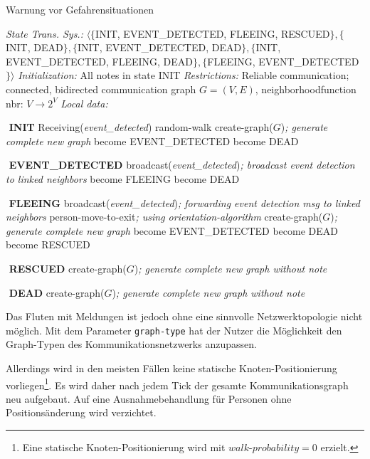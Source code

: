 \begin{algorithm}
\caption{Warnung vor Gefahrensituationen}
\label{alg:event_detected}
\begin{algorithmic} 
\STATE \textit{State Trans. Sys.:} $\langle\{$INIT, EVENT{\_}DETECTED, FLEEING, RESCUED$\}, \{$INIT, DEAD$\}, \{$INIT, EVENT{\_}DETECTED, DEAD$\}, \{$INIT, EVENT{\_}DETECTED, FLEEING, DEAD$\}, \{$FLEEING, EVENT{\_}DETECTED$\}\rangle$
\STATE \textit{Initialization:} All notes in state INIT
\STATE \textit{Restrictions:} Reliable communication; connected, bidirected communication graph $G = (V,E)$, neighborhoodfunction nbr: $V \rightarrow 2^{V}$
\STATE \textit{Local data:}

\STATE $ $
\STATE \textbf{INIT}
\STATE Receiving(\textit{event{\_}detected})
\STATE random-walk
\STATE create-graph($G$)\hfill\emph{; generate complete new graph}
\ENDWHILE
\STATE become EVENT{\_}DETECTED
\STATE become DEAD
\ENDIF

\STATE $ $
\STATE \textbf{EVENT{\_}DETECTED}
\STATE broadcast(\textit{event{\_}detected})\hfill\emph{; broadcast event detection to linked neighbors}
\STATE become FLEEING
\STATE become DEAD
\ENDIF

\STATE $ $
\STATE \textbf{FLEEING}
\STATE broadcast(\textit{event{\_}detected})\hfill\emph{; forwarding event detection msg to linked neighbors}
\ENDIF
{}
\STATE person-move-to-exit\hfill\emph{; using orientation-algorithm}
\STATE create-graph($G$)\hfill\emph{; generate complete new graph}
\STATE become EVENT{\_}DETECTED
\ENDIF
{}
\STATE become DEAD
\ENDIF
\ENDWHILE
\STATE become RESCUED

\STATE $ $
\STATE \textbf{RESCUED}
\STATE create-graph($G$)\hfill\emph{; generate complete new graph without note}

\STATE $ $
\STATE \textbf{DEAD}
\STATE create-graph($G$)\hfill\emph{; generate complete new graph without note}

\end{algorithmic}
\end{algorithm}

Das Fluten mit Meldungen ist jedoch ohne eine sinnvolle Netzwerktopologie nicht möglich. Mit dem Parameter \verb|graph-type| hat der Nutzer die Möglichkeit den Graph-Typen des Kommunikationsnetzwerks anzupassen. 

Allerdings wird in den meisten Fällen keine statische Knoten-Positionierung vorliegen\footnote{Eine statische Knoten-Positionierung wird mit $walk$-$probability = 0$ erzielt.}. Es wird daher nach jedem Tick der gesamte Kommunikationsgraph neu aufgebaut. Auf eine Ausnahmebehandlung für Personen ohne Positionsänderung wird verzichtet.

